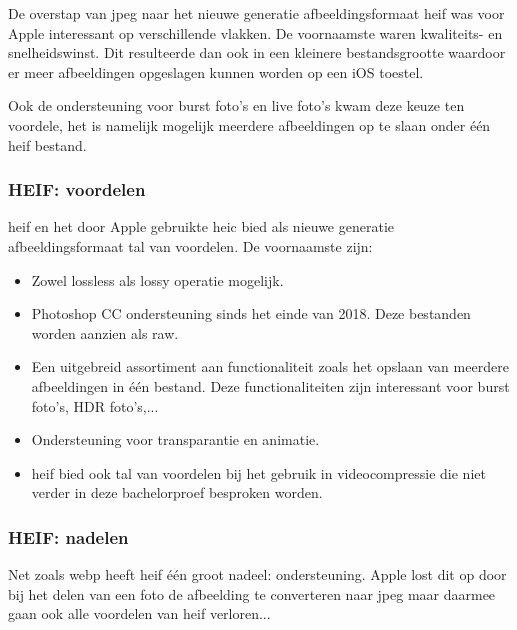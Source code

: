 De overstap van \gls{jpeg} naar het nieuwe generatie \gls{afbeeldingsformaat} \gls{heif} was voor Apple interessant op verschillende vlakken. De voornaamste waren kwaliteits- en snelheidswinst. Dit resulteerde dan ook in een kleinere bestandsgrootte waardoor er meer afbeeldingen opgeslagen kunnen worden op een iOS toestel.

Ook de ondersteuning voor burst foto's en live foto's kwam deze keuze ten voordele, het is namelijk mogelijk meerdere afbeeldingen op te slaan onder één \gls{heif} bestand.

\subsubsection{HEIF: voordelen}
\label{sec:afbeeldingscompressie-heif-voordelen}

\Gls{heif} en het door Apple gebruikte \gls{heic} bied als nieuwe generatie \gls{afbeeldingsformaat} tal van voordelen. De voornaamste zijn: 

\begin{itemize}
	\item Zowel \gls{lossless} als \gls{lossy} operatie mogelijk.
	
	\item Photoshop CC ondersteuning sinds het einde van 2018. Deze bestanden worden aanzien als \gls{raw}.
	
	\item Een uitgebreid assortiment aan functionaliteit zoals het opslaan van meerdere afbeeldingen in één bestand. Deze functionaliteiten zijn interessant voor burst foto's, HDR foto's,...
	
	\item Ondersteuning voor transparantie en animatie.
	
	\item \Gls{heif} bied ook tal van voordelen bij het gebruik in \gls{videocompressie} die niet verder in deze bachelorproef besproken worden.
\end{itemize}

\subsubsection{HEIF: nadelen}
\label{sec:afbeeldingscompressie-heif-nadelen}

Net zoals \gls{webp} heeft \gls{heif} één groot nadeel: ondersteuning. Apple lost dit op door bij het delen van een foto de afbeelding te converteren naar \gls{jpeg} maar daarmee gaan ook alle voordelen van \gls{heif} verloren... 

